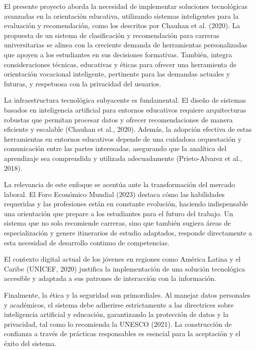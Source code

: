 El presente proyecto aborda la necesidad de implementar soluciones tecnológicas avanzadas en la orientación educativa, utilizando sistemas inteligentes para la evaluación y recomendación, como los descritos por Chauhan et al. (2020). La propuesta de un sistema de clasificación y recomendación para carreras universitarias se alinea con la creciente demanda de herramientas personalizadas que apoyen a los estudiantes en sus decisiones formativas. También, integra consideraciones técnicas, educativas y éticas para ofrecer una herramienta de orientación vocacional inteligente, pertinente para las demandas actuales y futuras, y respetuosa con la privacidad del usuarios.

La infraestructura tecnológica subyacente es fundamental. El diseño de sistemas basados en inteligencia artificial para entornos educativos requiere arquitecturas robustas que permitan procesar datos y ofrecer recomendaciones de manera eficiente y escalable (Chauhan et al., 2020). Además, la adopción efectiva de estas herramientas en entornos educativos depende de una cuidadosa orquestación y comunicación entre las partes interesadas, asegurando que la analítica del aprendizaje sea comprendida y utilizada adecuadamente (Prieto-Alvarez et al., 2018).

La relevancia de este enfoque se acentúa ante la transformación del mercado laboral. El Foro Económico Mundial (2023) destaca cómo las habilidades requeridas y las profesiones están en constante evolución, haciendo indispensable una orientación que prepare a los estudiantes para el futuro del trabajo. Un sistema que no solo recomiende carreras, sino que también sugiera áreas de especialización y genere itinerarios de estudio adaptados, responde directamente a esta necesidad de desarrollo continuo de competencias.

El contexto digital actual de los jóvenes en regiones como América Latina y el Caribe (UNICEF, 2020) justifica la implementación de una solución tecnológica accesible y adaptada a sus patrones de interacción con la información.

Finalmente, la ética y la seguridad son primordiales. Al manejar datos personales y académicos, el sistema debe adherirse estrictamente a las directrices sobre inteligencia artificial y educación, garantizando la protección de datos y la privacidad, tal como lo recomienda la UNESCO (2021). La construcción de confianza a través de prácticas responsables es esencial para la aceptación y el éxito del sistema.
